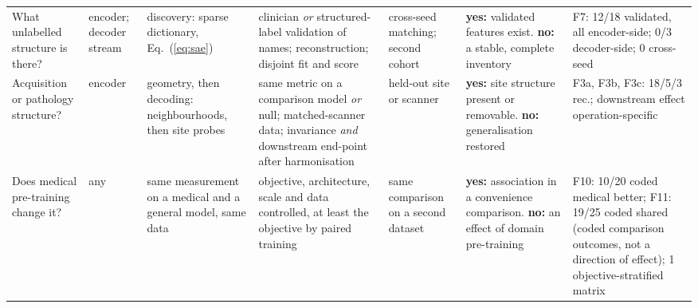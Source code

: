 \begin{table}[!t]
\begin{tabular}{@{}L{1.70cm}L{1.25cm}L{2.35cm}L{3.15cm}L{1.55cm}L{2.85cm}L{2.35cm}@{}}
What unlabelled structure is there? & encoder; decoder stream & discovery: sparse dictionary, Eq.~(\ref{eq:sae}) & clinician \emph{or} structured-label validation of names; reconstruction; disjoint fit and score & cross-seed matching; second cohort & \textbf{yes:} validated features exist. \textbf{no:} a stable, complete inventory & F7: 12/18 validated, all encoder-side; 0/3 decoder-side; 0 cross-seed \\
Acquisition or pathology structure? & encoder & geometry, then decoding: neighbourhoods, then site probes & same metric on a comparison model \emph{or} null; matched-scanner data; invariance \emph{and} downstream end-point after harmonisation & held-out site or scanner & \textbf{yes:} site structure present or removable. \textbf{no:} generalisation restored & F3a, F3b, F3c: 18/5/3 rec.; downstream effect operation-specific \\
Does medical pre-training change it? & any & same measurement on a medical and a general model, same data & objective, architecture, scale and data controlled, at least the objective by paired training & same comparison on a second dataset & \textbf{yes:} association in a convenience comparison. \textbf{no:} an effect of domain pre-training & F10: 10/20 coded medical better; F11: 19/25 coded shared (coded comparison outcomes, not a direction of effect); 1 objective-stratified matrix \\
\bottomrule
\end{tabular}
\end{table}
